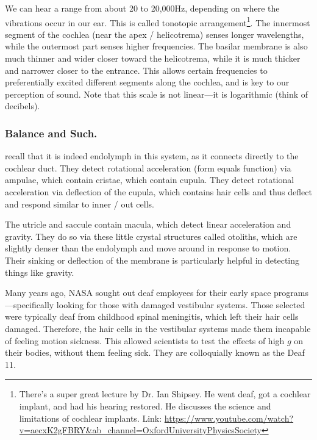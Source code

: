 We can hear a range from about 20 to 20,000Hz, depending on where the vibrations occur in our ear. This is called tonotopic arrangement\footnote{There's a super great lecture by Dr. Ian Shipsey. He went deaf, got a cochlear implant, and had his hearing restored. He discusses the science and limitations of cochlear implants. Link: \url{https://www.youtube.com/watch?v=aecxK2gFBRY&ab_channel=OxfordUniversityPhysicsSociety}}. The innermost segment of the cochlea (near the apex / helicotrema) senses longer wavelengths, while the outermost part senses higher frequencies. The basilar membrane is also much thinner and wider closer toward the helicotrema, while it is much thicker and narrower closer to the entrance. This allows certain frequencies to preferentially excited different segments along the cochlea, and is key to our perception of sound. Note that this scale is not linear---it is logarithmic (think of decibels).

\subsubsection{Balance and Such.}

recall that it is indeed endolymph in this system, as it connects directly to the cochlear duct. They detect rotational acceleration (form equals function) via ampulae, which contain cristae, which contain cupula. They detect rotational acceleration via deflection of the cupula, which contains hair cells and thus deflect and respond similar to inner / out cells.\newline

The utricle and saccule contain macula, which detect linear acceleration and gravity. They do so via these little crystal structures called otoliths, which are slightly denser than the endolymph and move around in response to motion. Their sinking or deflection of the membrane is particularly helpful in detecting things like gravity.\newline

Many years ago, NASA sought out deaf employees for their early space programs---specifically looking for those with damaged vestibular systems. Those selected were typically deaf from childhood spinal meningitis, which left their hair cells damaged. Therefore, the hair cells in the vestibular systems made them incapable of feeling motion sickness. This allowed scientists to test the effects of high $g$ on their bodies, without them feeling sick. They are colloquially known as the Deaf 11. 

